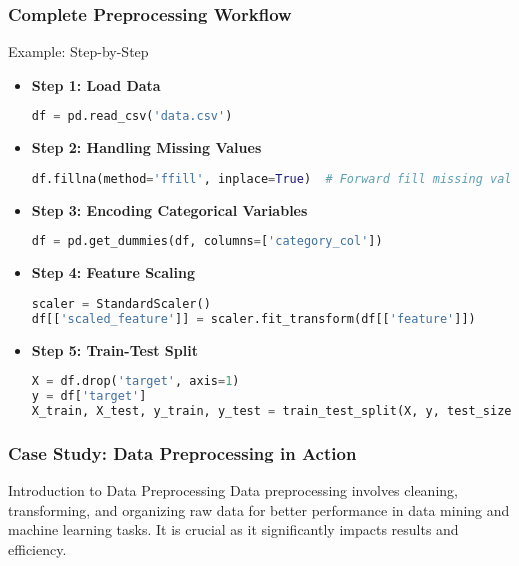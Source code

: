 \documentclass[aspectratio=169]{beamer}
\begin{document}
\begin{frame}[fragile]
    \frametitle{Complete Preprocessing Workflow}
    \begin{block}{Example: Step-by-Step}
    \begin{itemize}
        \item \textbf{Step 1: Load Data}
        \begin{lstlisting}[language=Python]
df = pd.read_csv('data.csv')
        \end{lstlisting}
        
        \item \textbf{Step 2: Handling Missing Values}
        \begin{lstlisting}[language=Python]
df.fillna(method='ffill', inplace=True)  # Forward fill missing values
        \end{lstlisting}

        \item \textbf{Step 3: Encoding Categorical Variables}
        \begin{lstlisting}[language=Python]
df = pd.get_dummies(df, columns=['category_col'])
        \end{lstlisting}

        \item \textbf{Step 4: Feature Scaling}
        \begin{lstlisting}[language=Python]
scaler = StandardScaler()
df[['scaled_feature']] = scaler.fit_transform(df[['feature']])
        \end{lstlisting}

        \item \textbf{Step 5: Train-Test Split}
        \begin{lstlisting}[language=Python]
X = df.drop('target', axis=1)
y = df['target']
X_train, X_test, y_train, y_test = train_test_split(X, y, test_size=0.2)
        \end{lstlisting}
    \end{itemize}
    \end{block}
\end{frame}

\begin{frame}[fragile]
    \frametitle{Case Study: Data Preprocessing in Action}
    \begin{block}{Introduction to Data Preprocessing}
        Data preprocessing involves cleaning, transforming, and organizing raw data for better performance in data mining and machine learning tasks. It is crucial as it significantly impacts results and efficiency.
    \end{block}
\end{frame}
\end{document}
